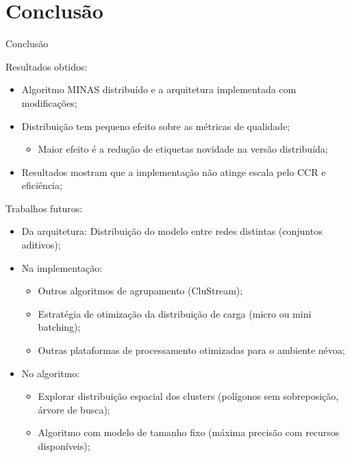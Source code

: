 \documentclass[aspectratio=1610,10pt]{beamer}
\newcommand{\minas}{MINAS\xspace}
\begin{document}
\section{Conclusão}
\begin{frame}{Conclusão}
  
  \begin{alertblock}{Resultados obtidos:}
  \begin{itemize}
    \item Algoritmo \minas distribuído e a arquitetura \arch
    implementada com modificações;
    \item Distribuição tem pequeno efeito sobre as métricas de qualidade;
    \begin{itemize}
      \item Maior efeito é a redução de etiquetas novidade na versão distribuída;
    \end{itemize}
    \item Resultados mostram que a implementação \mfog não atinge escala pelo CCR e eficiência;
  \end{itemize}
  \end{alertblock}
  
  \vspace{.5em}
  \begin{alertblock}{Trabalhos futuros:}
  \begin{itemize}
    \item Da arquitetura: Distribuição do modelo entre redes distintas (conjuntos aditivos);
    \item Na implementação:
    \begin{itemize}
    \item Outros algoritmos de agrupamento (CluStream);
    \item Estratégia de otimização da distribuição de carga (micro ou mini batching);
    \item Outras plataformas de processamento otimizadas para o ambiente névoa;
    \end{itemize}
    \item No algoritmo:
    \begin{itemize}
    \item Explorar distribuição espacial dos clusters (polígonos sem
    sobreposição, árvore de busca);
    \item Algoritmo com modelo de tamanho fixo (máxima precisão com recursos disponíveis);
    \end{itemize}
  \end{itemize}
  \end{alertblock}
\end{frame}
\end{document}
